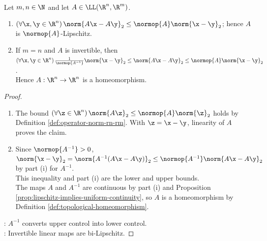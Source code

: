 \begin{theorem} \label{thm:finite-dimensional-linear-maps-lipschitz-homeomorphisms} \\
Let $m,n\in\N$ and let $A\in\LL(\R^n,\R^m)$.
\begin{enumerate}[label=(\roman*)]
\setlength{\itemsep}{0pt}
\item $(\forall\x,\y\in\R^n)\,\norm{A\x-A\y}_2\leq\normop{A}\norm{\x-\y}_2$; hence $A$ is $\normop{A}$-Lipschitz.
\item If $m=n$ and $A$ is invertible, then $(\forall\x,\y\in\R^n)\,\frac{1}{\normop{A^{-1}}}\norm{\x-\y}_2\leq\norm{A\x-A\y}_2\leq\normop{A}\norm{\x-\y}_2$.\\
Hence $A:\R^n\to\R^n$ is a homeomorphism.
\end{enumerate}
\begin{proof}
\begin{enumerate}[label=(\roman*)]
\setlength{\itemsep}{0pt}
\item The bound $(\forall\z\in\R^n)\,\norm{A\z}_2\leq\normop{A}\norm{\z}_2$ holds by Definition \ref{def:operator-norm-rn-rm}. With $\z=\x-\y$, linearity of $A$ proves the claim.
\item Since $\normop{A^{-1}}>0$, $\norm{\x-\y}_2=\norm{A^{-1}(A\x-A\y)}_2\leq\normop{A^{-1}}\norm{A\x-A\y}_2$ by part (i) for $A^{-1}$.\\
This inequality and part (i) are the lower and upper bounds.\\
The maps $A$ and $A^{-1}$ are continuous by part (i) and Proposition \ref{prop:lipschitz-implies-uniform-continuity}, so $A$ is a homeomorphism by Definition \ref{def:topological-homeomorphism}.
\end{enumerate}
: $A^{-1}$ converts upper control into lower control.\\
: Invertible linear maps are bi-Lipschitz.
\end{proof}
\end{theorem}

